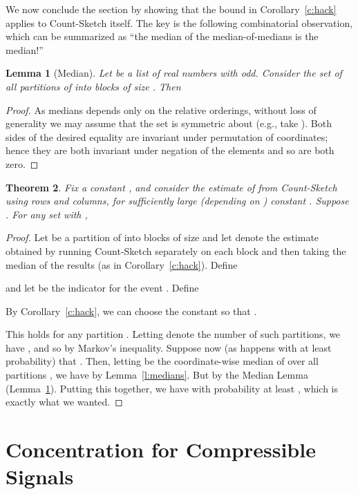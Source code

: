 \documentclass[letterpaper,11pt]{article}
\newtheorem{theorem}{Theorem}[section]
\newtheorem{lemma}[theorem]{Lemma}
\begin{document}
We now conclude the section by showing that the bound in
Corollary~\ref{c:hack} applies to Count-Sketch itself.
The key is the following combinatorial observation, which
can be summarized as ``the median of the median-of-medians is the median!''

\begin{lemma}[Median] \label{l:median3} Let
   be a list of  real numbers with 
  odd.  Consider the set  of all partitions  of  into blocks of size .  Then
  

\end{lemma}
\begin{proof}
  As medians depends only on the relative orderings, without loss of
  generality we may assume that the set  is symmetric about
   (e.g., take ).  Both sides of the
  desired equality are invariant under permutation of coordinates;
  hence they are both invariant under negation of the elements 
  and so are both zero.
\end{proof}

\begin{theorem} \label{thm:bettersets} Fix a constant , and
  consider the estimate  of  from Count-Sketch using 
  rows and  columns, for sufficiently large (depending on )
  constant .  Suppose .  For any set 
  with ,
  
\end{theorem}
\begin{proof}
  Let  be a partition of  into  blocks of
  size  and let  denote the estimate obtained by
  running Count-Sketch separately on each block and then taking the
  median of the results (as in Corollary~\ref{c:hack}).  Define

  and let  be the indicator for the event
  .
  Define

 By Corollary~\ref{c:hack}, we can choose the constant  so that
  .

  This holds for any partition .  Letting  denote
  the number of such partitions, we have ,
  and so  by Markov's
  inequality.  Suppose now (as happens with at least  probability)
  that .  Then, letting  be the 
  coordinate-wise median of  over all partitions ,
  we have  by
  Lemma~\ref{l:medians}.  But
   by the Median Lemma (Lemma~\ref{l:median3}).
  Putting this together, we have 
  with probability at least , which is exactly what we wanted.
\end{proof}

\section{Concentration for Compressible Signals}\label{sec:powerlaw}
\end{document}
